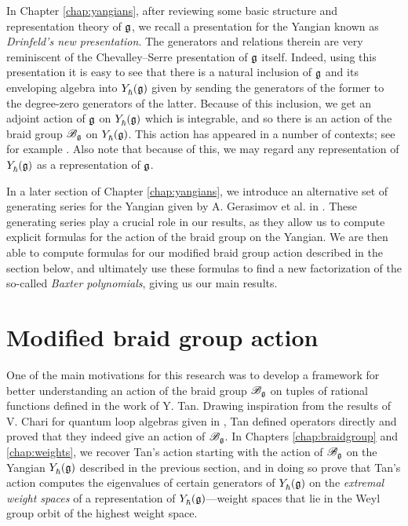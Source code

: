 In Chapter \ref{chap:yangians}, after reviewing some basic structure and representation theory of $\mathfrak{g}$, we recall a presentation for the Yangian known as \emph{Drinfeld's new presentation}.
The generators and relations therein are very reminiscent of the Chevalley--Serre presentation of $\mathfrak{g}$ itself.
Indeed, using this presentation it is easy to see that there is a natural inclusion of $\mathfrak{g}$ and its enveloping algebra into $Y_\hbar^{}(\mathfrak{g})$ given by sending the generators of the former to the degree-zero generators of the latter.
Because of this inclusion, we get an adjoint action of $\mathfrak{g}$ on $Y_\hbar^{}(\mathfrak{g})$ which is integrable, and so there is an action of the braid group $\mathscr{B}_{\mathfrak{g}}$ on $Y_\hbar^{}(\mathfrak{g})$.
This action has appeared in a number of contexts; see for example \cite{guay_coproduct_2018, kodera_braid_2019, weekes_highest_2016}.
Also note that because of this, we may regard any representation of $Y_\hbar^{}(\mathfrak{g})$ as a representation of $\mathfrak{g}$.

In a later section of Chapter \ref{chap:yangians}, we introduce an alternative set of generating series for the Yangian given by A. Gerasimov et al. in \cite{gerasimov_class_2005}.
These generating series play a crucial role in our results, as they allow us to compute explicit formulas for the action of the braid group on the Yangian.
We are then able to compute formulas for our modified braid group action described in the section below, and ultimately use these formulas to find a new factorization of the so-called \emph{Baxter polynomials}, giving us our main results.


\section{Modified braid group action}

One of the main motivations for this research was to develop a framework for better understanding an action of the braid group $\mathscr{B}_{\mathfrak{g}}$ on tuples of rational functions defined in the work \cite{tan_braid_2015} of Y. Tan.
Drawing inspiration from the results of V. Chari for quantum loop algebras given in \cite{chari_braid_2002}, Tan defined operators directly and proved that they indeed give an action of $\mathscr{B}_{\mathfrak{g}}$.
In Chapters \ref{chap:braidgroup} and \ref{chap:weights}, we recover Tan's action starting with the action of $\mathscr{B}_{\mathfrak{g}}$ on the Yangian $Y_\hbar^{}(\mathfrak{g})$ described in the previous section, and in doing so prove that Tan's action computes the eigenvalues of certain generators of $Y_\hbar^{}(\mathfrak{g})$ on the \emph{extremal weight spaces} of a representation of $Y_\hbar^{}(\mathfrak{g})$---weight spaces that lie in the Weyl group orbit of the highest weight space.


